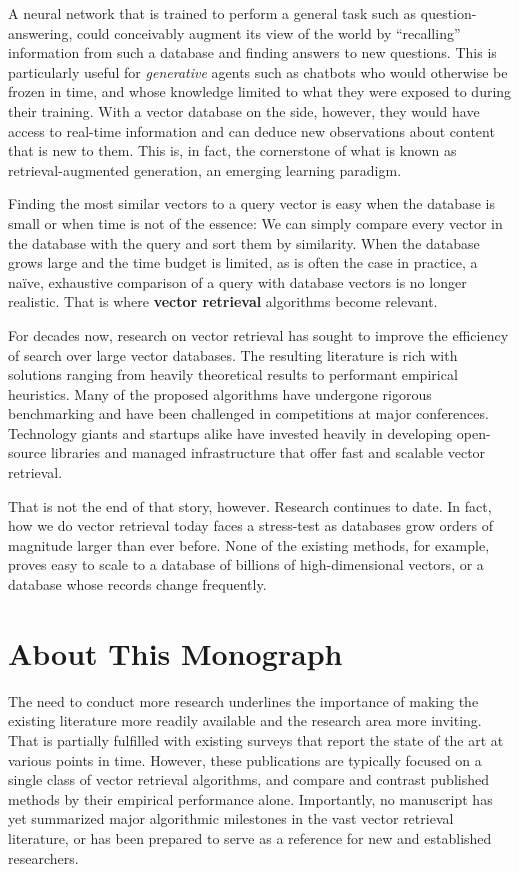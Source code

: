 A neural network that is trained to perform a general task such as question-answering,
could conceivably augment its view of the world by ``recalling'' information from such a database
and finding answers to new questions.
This is particularly useful for \emph{generative} agents such as chatbots
who would otherwise be frozen in time, and whose knowledge limited to
what they were exposed to during their training. With a vector database on the side,
however, they would have access to real-time information and can deduce new observations
about content that is new to them.
This is, in fact, the cornerstone of what is known as retrieval-augmented generation,
an emerging learning paradigm.

\bigskip

Finding the most similar vectors
to a query vector is easy when the database is small or when time is not of the essence:
We can simply compare every vector
in the database with the query and sort them by similarity. When the database grows large
and the time budget is limited, as is
often the case in practice, a na\"ive, exhaustive comparison of a query with database vectors
is no longer realistic.
That is where \textbf{vector retrieval} algorithms become relevant.

For decades now, research on vector retrieval has sought to improve the efficiency
of search over large vector databases. The resulting literature is rich with
solutions ranging from heavily theoretical results to performant empirical heuristics.
Many of the proposed algorithms have undergone rigorous benchmarking
and have been challenged in competitions at major conferences.
Technology giants and startups alike have invested heavily in developing
open-source libraries and managed infrastructure that offer fast and scalable
vector retrieval.

That is not the end of that story, however. Research continues to date.
In fact, how we do vector retrieval today faces a stress-test as
databases grow orders of magnitude larger than ever before.
None of the existing methods, for example, proves easy to scale to a
database of billions of high-dimensional vectors, or a database
whose records change frequently. 

\section*{About This Monograph}
The need to conduct more research underlines the importance of making the existing
literature more readily available and the research area more inviting.
That is partially fulfilled with existing surveys that report
the state of the art at various points in time. However, these publications
are typically focused on a single class of vector retrieval algorithms,
and compare and contrast published methods by their empirical performance alone.
Importantly, no manuscript has yet summarized major algorithmic milestones
in the vast vector retrieval literature, or has been prepared to serve as a reference
for new and established researchers.

